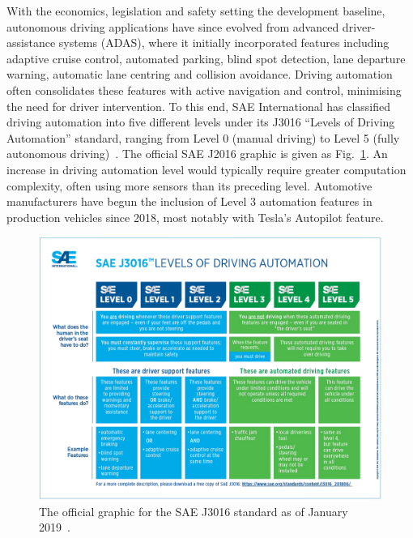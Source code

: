 With the economics, legislation and safety setting the development baseline, autonomous driving applications have since evolved from advanced driver-assistance systems (ADAS), where it initially incorporated features including adaptive cruise control, automated parking, blind spot detection, lane departure warning, automatic lane centring and collision avoidance. Driving automation often consolidates these features with active navigation and control, minimising the need for driver intervention. To this end, SAE International has classified driving automation into five different levels under its J3016 ``Levels of Driving Automation'' standard, ranging from Level 0 (manual driving) to Level 5 (fully autonomous driving)~\cite{on-road_automated_driving_orad_committee_taxonomy_2018}. %
The official SAE J2016 graphic is given as Fig.~\ref{fig:1:j3016}. An increase in driving automation level would typically require greater computation complexity, often using more sensors than its preceding level. Automotive manufacturers have begun the inclusion of Level 3 automation features in production vehicles since 2018, most notably with Tesla's Autopilot feature. 

\begin{figure}[H] 
	\centering    
	\includegraphics[width=\textwidth]{j3016}
	\caption[SAE J3016 official graphic]{The official graphic for the SAE J3016 standard as of January 2019~\cite{shuttleworth_sae_2019}.}
	\label{fig:1:j3016}
\end{figure}

